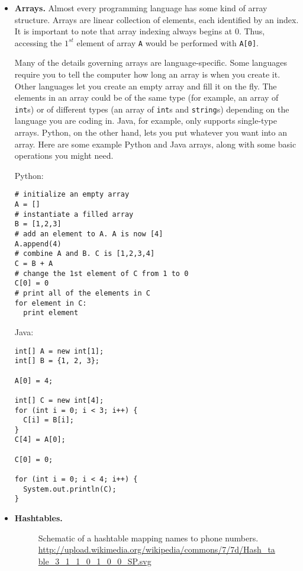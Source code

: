 \documentclass[a4paper]{article}
\begin{document}
\begin{itemize}

\item {\bf Arrays.} Almost  every programming language has some kind of array structure. Arrays are linear collection of elements, each identified by an index. It is important to note that array indexing always begins at 0. Thus, accessing the $1^{st}$ element of array \texttt{A} would be performed with \texttt{A[0]}.

Many of the details governing arrays are language-specific. Some languages require you to tell the computer how long an array is when you create it. Other languages let you create an empty array and fill it on the fly. The elements in an array could be of the same type (for example, an array of \texttt{int}s) or of different types (an array of \texttt{int}s and \texttt{string}s) depending on the language you are coding in. Java, for example, only supports single-type arrays. Python, on the other hand, lets you put whatever you want into an array. Here are some example Python and Java arrays, along with some basic operations you might need.

Python:
\begin{verbatim}
# initialize an empty array
A = []
# instantiate a filled array
B = [1,2,3]
# add an element to A. A is now [4]
A.append(4)
# combine A and B. C is [1,2,3,4]
C = B + A
# change the 1st element of C from 1 to 0
C[0] = 0
# print all of the elements in C
for element in C:
  print element
\end{verbatim}

Java:
\begin{verbatim}
int[] A = new int[1];
int[] B = {1, 2, 3};

A[0] = 4;

int[] C = new int[4];
for (int i = 0; i < 3; i++) {
  C[i] = B[i];
}
C[4] = A[0];

C[0] = 0;

for (int i = 0; i < 4; i++) {
  System.out.println(C);
}
\end{verbatim}

\item{\bf Hashtables.}

\begin{figure}
\begin{center}
\caption{\label{fig:hashtable} Schematic of a hashtable mapping names to phone numbers. \url{http://upload.wikimedia.org/wikipedia/commons/7/7d/Hash_table_3_1_1_0_1_0_0_SP.svg}}
\end{center}\end{figure}


\end{itemize}
\end{document}
